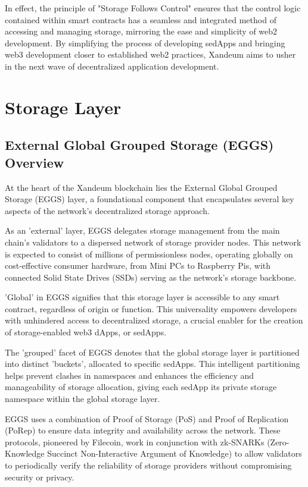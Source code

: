 \documentclass[11pt]{article}   	%
\let\oldsection\section
\renewcommand{\section}{\clearpage\oldsection}
\begin{document}
In effect, the principle of "Storage Follows Control" ensures that the control logic contained within smart contracts has a seamless and integrated method of accessing and managing storage, mirroring the ease and simplicity of web2 development. By simplifying the process of developing sedApps and bringing web3 development closer to established web2 practices, Xandeum aims to usher in the next wave of decentralized application development.

\section{Storage Layer}
\subsection{External Global Grouped Storage (EGGS) Overview}
At the heart of the Xandeum blockchain lies the External Global Grouped Storage (EGGS) layer, a foundational component that encapsulates several key aspects of the network's decentralized storage approach.

As an 'external' layer, EGGS delegates storage management from the main chain's validators to a dispersed network of storage provider nodes. This network is expected to consist of millions of permissionless nodes, operating globally on cost-effective consumer hardware, from Mini PCs to Raspberry Pis, with connected Solid State Drives (SSDs) serving as the network's storage backbone.

'Global' in EGGS signifies that this storage layer is accessible to any smart contract, regardless of origin or function. This universality empowers developers with unhindered access to decentralized storage, a crucial enabler for the creation of storage-enabled web3 dApps, or sedApps.

The 'grouped' facet of EGGS denotes that the global storage layer is partitioned into distinct 'buckets', allocated to specific sedApps. This intelligent partitioning helps prevent clashes in namespaces and enhances the efficiency and manageability of storage allocation, giving each sedApp its private storage namespace within the global storage layer.

EGGS uses a combination of Proof of Storage (PoS) and Proof of Replication (PoRep) to ensure data integrity and availability across the network. These protocols, pioneered by Filecoin, work in conjunction with zk-SNARKs (Zero-Knowledge Succinct Non-Interactive Argument of Knowledge) to allow validators to periodically verify the reliability of storage providers without compromising security or privacy.
\end{document}
